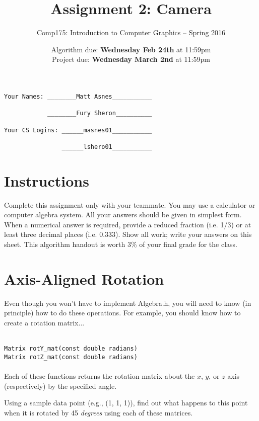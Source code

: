\documentclass[10pt,twocolumn]{article}
\title{\Huge{\bf Assignment 2: Camera}}
\author{Comp175: Introduction to Computer Graphics -- Spring 2016}
\date{Algorithm due:  {\bf Wednesday Feb 24th} at 11:59pm\\
Project due:  {\bf Wednesday March 2nd} at 11:59pm}
\begin{document}
\maketitle

\begin{verbatim}
Your Names: ________Matt Asnes___________

            ________Fury Sheron__________

Your CS Logins: ______masnes01___________

                ______lshero01___________
\end{verbatim}

\section{Instructions}
Complete this assignment only with your teammate. You may use a
calculator or computer algebra system. All your answers should be given in simplest form.
When a numerical answer is required, provide a reduced fraction (i.e. 1/3) or at least three
decimal places (i.e. 0.333). Show all work; write your answers on this sheet. This algorithm handout is worth 3\% of your final grade for the class.

\vspace{-0.4cm}
\section{Axis-Aligned Rotation}

Even though you won't have to implement Algebra.h, you will need to know (in principle) how to do these operations. For example, you should know how to create a rotation matrix...

\\
{\tt Matrix rotY\_mat(const double radians)}\\
{\tt Matrix rotZ\_mat(const double radians)}\\\\
Each of these functions returns the rotation matrix about the $x$, $y$, or $z$ axis (respectively) by the specified angle.
\begin{framed}
\noindent {\bf [1 point]} Using a sample data point (e.g., (1, 1, 1)), find out what happens to this point when it is rotated by 45 \emph{degrees} using each of these matrices.
\end{framed}
\end{document}
